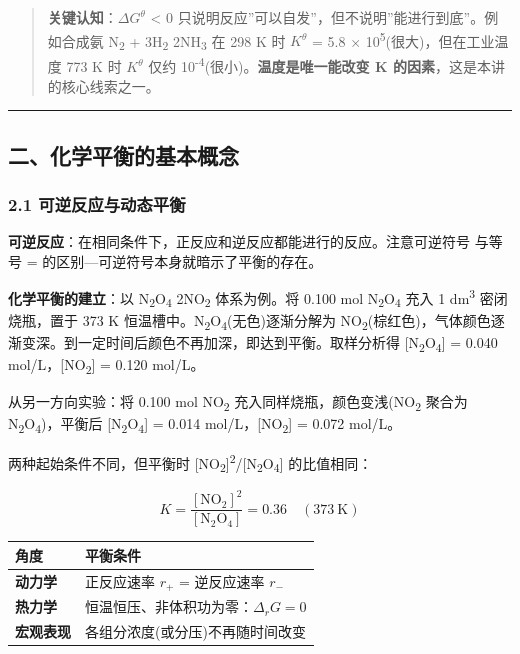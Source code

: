 \begin{quote}
\textbf{关键认知}：\(\Delta G^\theta\) \textless{} 0 只说明反应''可以自发''，但不说明''能进行到底''。例如合成氨 N\textsubscript{2} + 3H\textsubscript{2} \衡 2NH\textsubscript{3} 在 298 K 时 \(K^\theta\) = 5.8 × 10\textsuperscript{5}(很大)，但在工业温度 773 K 时 \(K^\theta\) 仅约 10\textsuperscript{-4}(很小)。\textbf{温度是唯一能改变 K 的因素}，这是本讲的核心线索之一。
\end{quote}

\begin{center}\rule{0.5\linewidth}{0.5pt}\end{center}

\subsection{二、化学平衡的基本概念}\label{ux4e8cux5316ux5b66ux5e73ux8861ux7684ux57faux672cux6982ux5ff5}

\subsubsection{2.1 可逆反应与动态平衡}\label{ux53efux9006ux53cdux5e94ux4e0eux52a8ux6001ux5e73ux8861}

\textbf{可逆反应}：在相同条件下，正反应和逆反应都能进行的反应。注意可逆符号 \衡 与等号 = 的区别---可逆符号本身就暗示了平衡的存在。

\textbf{化学平衡的建立}：以 N\textsubscript{2}O\textsubscript{4} \衡 2NO\textsubscript{2} 体系为例。将 0.100 mol N\textsubscript{2}O\textsubscript{4} 充入 1 dm\textsuperscript{3} 密闭烧瓶，置于 373 K 恒温槽中。N\textsubscript{2}O\textsubscript{4}(无色)逐渐分解为 NO\textsubscript{2}(棕红色)，气体颜色逐渐变深。到一定时间后颜色不再加深，即达到平衡。取样分析得 {[}N\textsubscript{2}O\textsubscript{4}{]} = 0.040 mol/L，{[}NO\textsubscript{2}{]} = 0.120 mol/L。

从另一方向实验：将 0.100 mol NO\textsubscript{2} 充入同样烧瓶，颜色变浅(NO\textsubscript{2} 聚合为 N\textsubscript{2}O\textsubscript{4})，平衡后 {[}N\textsubscript{2}O\textsubscript{4}{]} = 0.014 mol/L，{[}NO\textsubscript{2}{]} = 0.072 mol/L。

两种起始条件不同，但平衡时 {[}NO\textsubscript{2}{]}\textsuperscript{2}/{[}N\textsubscript{2}O\textsubscript{4}{]} 的比值相同：

\[
K = \frac{[\mathrm{NO_2}]^2}{[\mathrm{N_2O_4}]} = 0.36 \quad (373\ \mathrm{K})
\]

{\def\LTcaptype{none} %
\begin{longtable}[]{@{}ll@{}}
\toprule\noalign{}
角度 & 平衡条件 \\
\midrule\noalign{}
\endhead
\bottomrule\noalign{}
\endlastfoot
\textbf{动力学} & 正反应速率 \(r_+\) = 逆反应速率 \(r_-\) \\
\textbf{热力学} & 恒温恒压、非体积功为零：\(\Delta_r G = 0\) \\
\textbf{宏观表现} & 各组分浓度(或分压)不再随时间改变 \\
\end{longtable}
}

